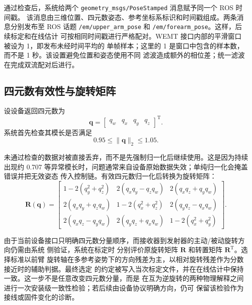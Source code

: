 通过检查后，系统给两个 \texttt{geometry\_msgs/PoseStamped} 消息赋予同一个 ROS 时间戳。
该消息由三维位置、四元数姿态、参考坐标系标识和时间戳组成。两条消息分别发布至 ROS 话题
\texttt{/em/upper\_arm\_pose} 和 \texttt{/em/forearm\_pose}。这样，后续标定和在线估计
可按相同时间戳进行严格配对。WEMT 接口内部的平滑窗口被设为 1，即发布未经时间平均的
单帧样本；这里的 1 是窗口中包含的样本数，而不是 1 秒。该设置避免位置和姿态使用不同
滤波造成额外的相位差；统一滤波在完成双流配对后进行。

\subsection{四元数有效性与旋转矩阵}
\label{subsec:ch4_quaternion_validation}

设设备返回四元数为
\begin{equation}
  \boldsymbol q=\begin{bmatrix}q_w&q_x&q_y&q_z\end{bmatrix}^{\mathrm T}.
  \label{eq:ch4_quaternion}
\end{equation}
系统首先检查其模长是否满足
\begin{equation}
  0.95\leq \lVert\boldsymbol q\rVert_2\leq1.05.
  \label{eq:ch4_quaternion_norm_gate}
\end{equation}

未通过检查的数据对被直接丢弃，而不是先强制归一化后继续使用。这是因为持续出现约
0.707 等异常模长时，问题通常来自设备原始数据失效；单纯归一化会掩盖错误并把无效姿态
传入控制链。有效四元数归一化后转换为旋转矩阵：
\begin{equation}
\boldsymbol R(\boldsymbol q)=
\begin{bmatrix}
1-2(q_y^2+q_z^2) & 2(q_xq_y-q_zq_w) & 2(q_xq_z+q_yq_w)\\
2(q_xq_y+q_zq_w) & 1-2(q_x^2+q_z^2) & 2(q_yq_z-q_xq_w)\\
2(q_xq_z-q_yq_w) & 2(q_yq_z+q_xq_w) & 1-2(q_x^2+q_y^2)
\end{bmatrix}.
\label{eq:ch4_quaternion_to_rotation}
\end{equation}

由于当前设备接口只明确四元数分量顺序，而接收器到发射器的主动/被动旋转方向仍需由系统
侧验证，系统在标定时
分别评价原旋转矩阵 $\boldsymbol R$ 和转置矩阵 $\boldsymbol R^{\mathrm T}$。选择标准以前臂
旋转轴在多参考姿势下的方向残差为主，以相对旋转残差作为分数接近时的辅助判据。最终选定
的约定被写入当次标定文件，并在在线估计中保持一致。这一步不是任意改变四元数分量，而是
在互为逆旋转的两种物理解释之间进行一次安装级一致性检验；若后续由设备协议明确方向，仍可
保留该检验作为接线或固件变化的诊断。

